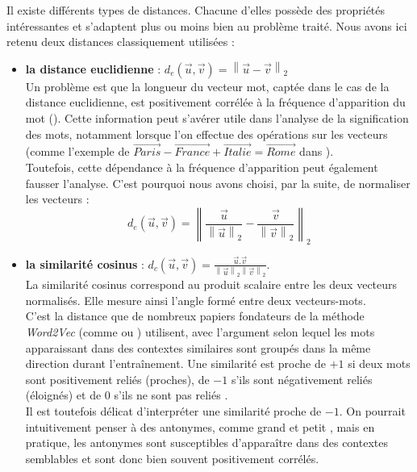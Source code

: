 \documentclass[11pt,french,french]{article}
\providecommand{\tightlist}{%
  \setlength{\parskip}{0pt}
  }
\begin{document}
Il existe différents types de distances. Chacune d'elles possède des
propriétés intéressantes et s'adaptent plus ou moins bien au problème
traité. Nous avons ici retenu deux distances classiquement utilisées :

\begin{itemize}
\tightlist
\item
  \textbf{la distance euclidienne} :
  \(d_{e}(\vec{u},\vec{v}) = \left\| \vec{u} - \vec{v} \right\|_2\)\\
  Un problème est que la longueur du vecteur mot, captée dans le cas de
  la distance euclidienne, est positivement corrélée à la fréquence
  d'apparition du mot (\cite{Schakel}). Cette information peut s'avérer
  utile dans l'analyse de la signification des mots, notamment lorsque
  l'on effectue des opérations sur les vecteurs (comme l'exemple de
  \(\overrightarrow{Paris} - \overrightarrow{France} + \overrightarrow{Italie} = \overrightarrow{Rome}\)
  dans \cite{Mikolov}).\\
  Toutefois, cette dépendance à la fréquence d'apparition peut également
  fausser l'analyse. C'est pourquoi nous avons choisi, par la suite, de
  normaliser les vecteurs :
  \[ d_{e}(\vec{u},\vec{v}) = \left\| \frac{\vec{u}}{\left\| \vec{u} \right\|_2} - \frac{\vec{v}}{\left\| \vec{v} \right\|_2}  \right\|_2\]
\item
  \textbf{la similarité cosinus} :
  \(d_{c}(\vec{u}, \vec{v}) = \frac{\vec{u}.\vec{v}}{\left\| \vec{u} \right\|_2 \left\| \vec{v} \right\|_2 }\).\\
  La similarité cosinus correspond au produit scalaire entre les deux
  vecteurs normalisés. Elle mesure ainsi l'angle formé entre deux
  vecteurs-mots.\\
  C'est la distance que de nombreux papiers fondateurs de la méthode
  \emph{Word2Vec} (comme \cite{Mikolov} ou \cite{Levy}) utilisent, avec
  l'argument selon lequel les mots apparaissant dans des contextes
  similaires sont groupés dans la même direction durant l'entraînement.
  Une similarité est proche de \(+1\) si deux mots sont positivement
  reliés (proches), de \(-1\) s'ils sont négativement reliés (éloignés)
  et de 0 s'ils ne sont pas \og reliés \fg{}.\\
  Il est toutefois délicat d'interpréter une similarité proche de
  \(-1\). On pourrait intuitivement penser à des antonymes, comme
  \og grand \fg{} et \og petit \fg{}, mais en pratique, les antonymes
  sont susceptibles d'apparaître dans des contextes semblables et sont
  donc bien souvent positivement corrélés.
\end{itemize}
\end{document}
